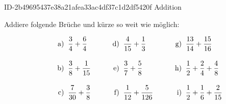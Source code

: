 \begin{exercise}
      {ID-2b49695437e38a21afea33ac4df37c1d2df5420f}
      {Addition}
  \ifproblem\problem\par
    Addiere folgende Brüche und kürze so weit
    wie möglich:
    \newcommand{\no}[1]
    {%
      \vphantom{\Bigg(}%
      \makebox[3em][r]%
      {%
        #1)%
      }%
      \;\;&%
    }%
    \begin{align*}
      \no{a} \frac{3}{4}+\frac{6}{4}  & \no{d} \frac{4}{15}+\frac{1}{3}   & \no{g} \frac{13}{14}+\frac{15}{16}         \\
      \no{b} \frac{3}{8}+\frac{1}{15} & \no{e} \frac{3}{7}+\frac{5}{8}    & \no{h} \frac{1}{2}+\frac{2}{4}+\frac{4}{8} \\
      \no{c} \frac{7}{30}+\frac{3}{8} & \no{f} \frac{1}{12}+\frac{5}{126} & \no{i} \frac{1}{2}+\frac{1}{6}+\frac{2}{15}
    \end{align*}
  \fi
\end{exercise}
